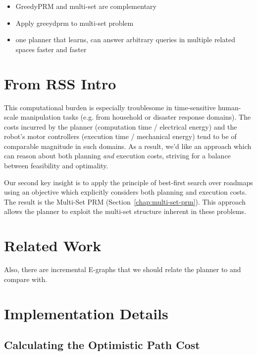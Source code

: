 \documentclass{report}
\begin{document}
\begin{itemize}
\item GreedyPRM and multi-set are complementary
\item Apply greeydprm to multi-set problem
\item one planner that learns, can answer arbitrary queries
   in multiple related spaces faster and faster
\end{itemize}

\section{From RSS Intro}

This computational burden is especially troublesome
in time-sensitive human-scale manipulation tasks
(e.g. from household or disaster response domains).
The costs incurred by the planner
(computation time / electrical energy)
and the robot's motor controllers
(execution time / mechanical energy)
tend to be of comparable magnitude in such domains.
As a result,
we'd like an approach which can reason about both
planning \emph{and} execution costs,
striving for a balance between feasibility and optimality.

Our second key insight
is to apply the principle of best-first search over roadmaps
using an objective which explicitly considers both planning and
execution costs.
The result is the Multi-Set PRM (Section~\ref{chap:multi-set-prm}).
This approach allows the planner to exploit the multi-set structure
inherent in these problems.

\section{Related Work}

Also, there are incremental E-graphs \cite{phillips2013anytimeegraphs}
that we should relate the planner to and compare with.

\section{Implementation Details}

\subsection{Calculating the Optimistic Path Cost}
\label{subsec:alg-opt-path-cost}
\end{document}
